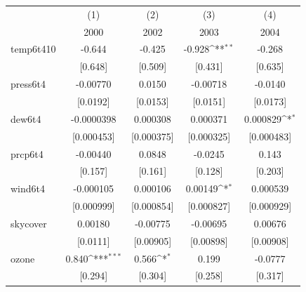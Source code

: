 \documentclass[11pt]{article}
\begin{document}
\begin{subappendices}
		\newpage
		\begin{center}
			 \label{tab:title} 
			{
				{
					\def\sym#1{\ifmmode^{#1}\else\(^{#1}\)\fi}
					\begin{tabular}{l*{4}{c}}
						\hline\hline
						&\multicolumn{1}{c}{(1)}&\multicolumn{1}{c}{(2)}&\multicolumn{1}{c}{(3)}&\multicolumn{1}{c}{(4)}\\
						&\multicolumn{1}{c}{2000}&\multicolumn{1}{c}{2002}&\multicolumn{1}{c}{2003}&\multicolumn{1}{c}{2004}\\
						\hline
						temp6t410   &      -0.644         &      -0.425         &      -0.928\sym{**} &      -0.268         \\
						&     [0.648]         &     [0.509]         &     [0.431]         &     [0.635]         \\
						[1em]
						press6t4    &    -0.00770         &      0.0150         &    -0.00718         &     -0.0140         \\
						&    [0.0192]         &    [0.0153]         &    [0.0151]         &    [0.0173]         \\
						[1em]
						dew6t4      &  -0.0000398         &    0.000308         &    0.000371         &    0.000829\sym{*}  \\
						&  [0.000453]         &  [0.000375]         &  [0.000325]         &  [0.000483]         \\
						[1em]
						prcp6t4     &    -0.00440         &      0.0848         &     -0.0245         &       0.143         \\
						&     [0.157]         &     [0.161]         &     [0.128]         &     [0.203]         \\
						[1em]
						wind6t4     &   -0.000105         &    0.000106         &     0.00149\sym{*}  &    0.000539         \\
						&  [0.000999]         &  [0.000854]         &  [0.000827]         &  [0.000929]         \\
						[1em]
						skycover    &     0.00180         &    -0.00775         &    -0.00695         &     0.00676         \\
						&    [0.0111]         &   [0.00905]         &   [0.00898]         &   [0.00908]         \\
						[1em]
						ozone       &       0.840\sym{***}&       0.566\sym{*}  &       0.199         &     -0.0777         \\
						&     [0.294]         &     [0.304]         &     [0.258]         &     [0.317]         \\

\end{tabular}}}
\end{center}
\end{subappendices}
\end{document}
